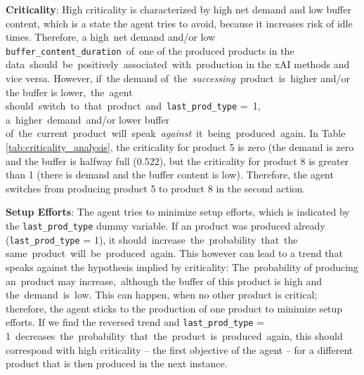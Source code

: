 \textbf{Criticality}:
High criticality is characterized by high net demand and low buffer content, which is a state the agent tries to avoid, because it increases risk of idle times.
Therefore, a high net demand and/or low \texttt{buffer\_content\_duration} of one of the produced products in the data should be positively associated with production in the xAI methods and vice versa. However, if the demand of the\textit{ successing }product is higher and/or the buffer is lower, the agent should switch to that product and \texttt{last\_prod\_type} = 1, a higher demand and/or lower\textit{ }buffer of the current product will speak \textit{against} it being produced again.
In Table \ref{tab:criticality_analysis}, the criticality for product 5 is zero (the demand is zero and the buffer is halfway full (0.522), but the criticality for product 8 is greater than 1 (there is demand and the buffer content is low). Therefore, the agent switches from producing product 5 to product 8 in the second action.

\textbf{Setup Efforts}:
The agent tries to minimize setup efforts, which is indicated by the \texttt{last\_prod\_type} dummy variable. If an product was produced already (\texttt{last\_prod\_type} = 1), it should increase the probability that the same product will be produced again. This however can lead to a trend that speaks against the hypothesis implied by criticality: The probability of producing an product may increase, although the buffer of this product is high and the demand is low. This can happen, when no other product is critical; therefore, the agent sticks to the production of one product to minimize setup efforts.
If we find the reversed trend and \texttt{last\_prod\_type} = 1 decreases the probability that the product is produced again, this should correspond with high criticality – the first objective of the agent – for a different product that is then produced in the next instance.

